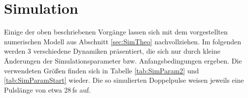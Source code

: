 \documentclass[bachelor,       %
               twoside,        %
               BCOR10mm,       %
               liststotoc,nomtotoc,bibtotoc, %
               english,ngerman, %
               final,          %
               ]{GAUBM}
\begin{document}
\section{Simulation}
\label{sec:SimPrax}
Einige der oben beschriebenen Vorgänge lassen sich mit dem vorgestellten numerischen Modell aus Abschnitt \ref{sec:SimTheo} nachvollziehen.
Im folgenden werden 3 verschiedene Dynamiken präsentiert, die sich nur durch kleine Änderungen der Simulationsparameter bzw. Anfangsbedingungen ergeben.
Die verwendeten Größen finden sich in Tabelle \ref{tab:SimParam2} und \ref{tab:SimParamStart} wieder.
Die so simulierten Doppelpulse weisen jeweils eine Pulslänge von etwa 28\,fs auf.
\end{document}
